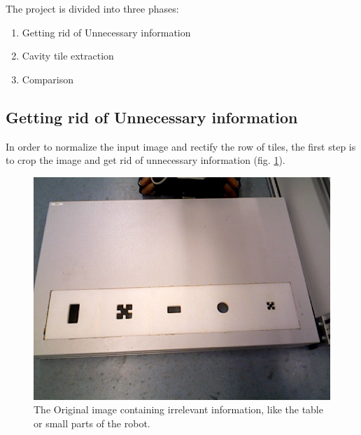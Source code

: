 \documentclass{article}
\begin{document}
The project is divided into three phases: 
\begin{enumerate}
\item Getting rid of Unnecessary information
\item Cavity tile extraction
\item Comparison
\end{enumerate}

\subsection{Getting rid of Unnecessary information}

In order to normalize the input image and rectify the row of tiles, the first step is to crop the image and get rid of unnecessary information (fig. \ref{fig:original}). \\
\begin{figure}[h!]
\centering
\includegraphics[scale=0.3]{images/frame01.jpg}
\caption{The Original image containing irrelevant information, like the table or small parts of the robot.}
\label{fig:original}
\end{figure}
\end{document}
